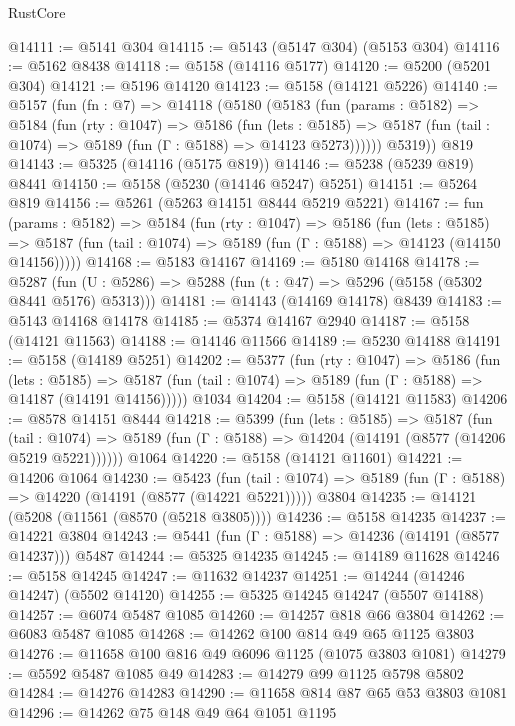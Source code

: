 \begin{lexlean}{RustCore}
\begin{coremodule}
@14111 := @5141 @304
@14115 := @5143 (@5147 @304) (@5153 @304)
@14116 := @5162 @8438
@14118 := @5158 (@14116 @5177)
@14120 := @5200 (@5201 @304)
@14121 := @5196 @14120
@14123 := @5158 (@14121 @5226)
@14140 := @5157
    (fun (fn : @7) =>
    @14118
      (@5180
        (@5183
          (fun (params : @5182) =>
          @5184
            (fun (rty : @1047) =>
            @5186
              (fun (lets : @5185) =>
              @5187 (fun (tail : @1074) => @5189 (fun (Γ : @5188) => @14123 @5273))))))
        @5319))
    @819
@14143 := @5325 (@14116 (@5175 @819))
@14146 := @5238 (@5239 @819) @8441
@14150 := @5158 (@5230 (@14146 @5247) @5251)
@14151 := @5264 @819
@14156 := @5261 (@5263 @14151 @8444 @5219 @5221)
@14167 := fun (params : @5182) =>
  @5184
    (fun (rty : @1047) =>
    @5186
      (fun (lets : @5185) =>
      @5187 (fun (tail : @1074) => @5189 (fun (Γ : @5188) => @14123 (@14150 @14156)))))
@14168 := @5183 @14167
@14169 := @5180 @14168
@14178 := @5287
    (fun (U : @5286) => @5288 (fun (t : @47) => @5296 (@5158 (@5302 @8441 @5176) @5313)))
@14181 := @14143 (@14169 @14178) @8439
@14183 := @5143 @14168 @14178
@14185 := @5374 @14167 @2940
@14187 := @5158 (@14121 @11563)
@14188 := @14146 @11566
@14189 := @5230 @14188
@14191 := @5158 (@14189 @5251)
@14202 := @5377
    (fun (rty : @1047) =>
    @5186
      (fun (lets : @5185) =>
      @5187 (fun (tail : @1074) => @5189 (fun (Γ : @5188) => @14187 (@14191 @14156)))))
    @1034
@14204 := @5158 (@14121 @11583)
@14206 := @8578 @14151 @8444
@14218 := @5399
    (fun (lets : @5185) =>
    @5187
      (fun (tail : @1074) =>
      @5189 (fun (Γ : @5188) => @14204 (@14191 (@8577 (@14206 @5219 @5221))))))
    @1064
@14220 := @5158 (@14121 @11601)
@14221 := @14206 @1064
@14230 := @5423
    (fun (tail : @1074) => @5189 (fun (Γ : @5188) => @14220 (@14191 (@8577 (@14221 @5221)))))
    @3804
@14235 := @14121 (@5208 (@11561 (@8570 (@5218 @3805))))
@14236 := @5158 @14235
@14237 := @14221 @3804
@14243 := @5441 (fun (Γ : @5188) => @14236 (@14191 (@8577 @14237))) @5487
@14244 := @5325 @14235
@14245 := @14189 @11628
@14246 := @5158 @14245
@14247 := @11632 @14237
@14251 := @14244 (@14246 @14247) (@5502 @14120)
@14255 := @5325 @14245 @14247 (@5507 @14188)
@14257 := @6074 @5487 @1085
@14260 := @14257 @818 @66 @3804
@14262 := @6083 @5487 @1085
@14268 := @14262 @100 @814 @49 @65 @1125 @3803
@14276 := @11658 @100 @816 @49 @6096 @1125 (@1075 @3803 @1081)
@14279 := @5592 @5487 @1085 @49
@14283 := @14279 @99 @1125 @5798 @5802
@14284 := @14276 @14283
@14290 := @11658 @814 @87 @65 @53 @3803 @1081
@14296 := @14262 @75 @148 @49 @64 @1051 @1195

\end{coremodule}
\end{lexlean}
